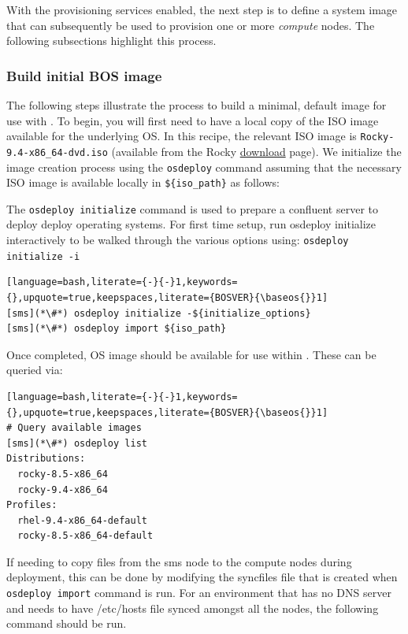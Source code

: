 
With the provisioning services enabled, the next step is to define
a system image that can subsequently be
used to provision one or more {\em compute} nodes. The following subsections highlight this process.

\subsubsection{Build initial BOS image} \label{sec:assemble_bos}
The following steps illustrate the process to build a minimal, default image for use with \Confluent{}. To begin, you will
first need to have a local copy of the ISO image available for the underlying OS. In this recipe, the relevant ISO image
is \texttt{Rocky-9.4-x86\_64-dvd.iso} (available from the Rocky
\href{https://rockylinux.org/download/}{\color{blue}download} page).
We initialize the image
creation process using the \texttt{osdeploy} command assuming that the necessary ISO image is available locally in
\texttt{\$\{iso\_path\}} as follows:

The \texttt{osdeploy initialize} command is used to prepare a confluent server to deploy deploy operating systems.
For first time setup, run osdeploy initialize interactively to be walked through the various options using:
\texttt{osdeploy initialize -i}

\begin{lstlisting}[language=bash,literate={-}{-}1,keywords={},upquote=true,keepspaces,literate={BOSVER}{\baseos{}}1]
[sms](*\#*) osdeploy initialize -${initialize_options}
[sms](*\#*) osdeploy import ${iso_path}

\end{lstlisting}

\noindent Once completed, OS image should be available for use within \Confluent{}. These can be queried via:

\begin{lstlisting}[language=bash,literate={-}{-}1,keywords={},upquote=true,keepspaces,literate={BOSVER}{\baseos{}}1]
# Query available images
[sms](*\#*) osdeploy list
Distributions:
  rocky-8.5-x86_64
  rocky-9.4-x86_64
Profiles:
  rhel-9.4-x86_64-default
  rocky-8.5-x86_64-default
\end{lstlisting}

If needing to copy files from the sms node to the compute nodes during deployment, this can be done by
modifying the syncfiles file that is created when \texttt{osdeploy import} command is run. For an environment
that has no DNS server and needs to have /etc/hosts file synced amongst all the nodes, the following command
should be run.

